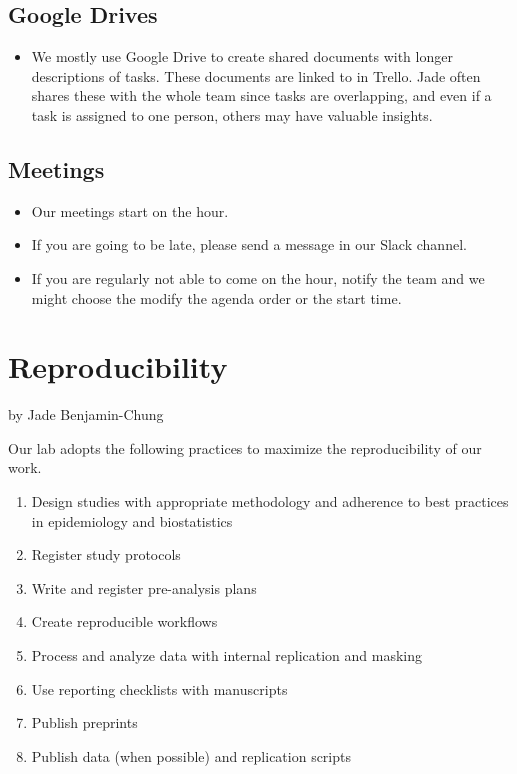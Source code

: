 \documentclass[
]{book}
\providecommand{\tightlist}{%
  \setlength{\itemsep}{0pt}\setlength{\parskip}{0pt}}
\begin{document}
\hypertarget{google-drives}{%
\section{Google Drives}\label{google-drives}}

\begin{itemize}
\tightlist
\item
  We mostly use Google Drive to create shared documents with longer descriptions of tasks. These documents are linked to in Trello. Jade often shares these with the whole team since tasks are overlapping, and even if a task is assigned to one person, others may have valuable insights.
\end{itemize}

\hypertarget{meetings}{%
\section{Meetings}\label{meetings}}

\begin{itemize}
\tightlist
\item
  Our meetings start on the hour.
\item
  If you are going to be late, please send a message in our Slack channel.
\item
  If you are regularly not able to come on the hour, notify the team and we might choose the modify the agenda order or the start time.
\end{itemize}

\hypertarget{reproducibility}{%
\chapter{Reproducibility}\label{reproducibility}}

by Jade Benjamin-Chung

Our lab adopts the following practices to maximize the reproducibility of our work.

\begin{enumerate}
\def\labelenumi{\arabic{enumi}.}
\tightlist
\item
  Design studies with appropriate methodology and adherence to best practices in epidemiology and biostatistics
\item
  Register study protocols
\item
  Write and register pre-analysis plans
\item
  Create reproducible workflows
\item
  Process and analyze data with internal replication and masking
\item
  Use reporting checklists with manuscripts
\item
  Publish preprints
\item
  Publish data (when possible) and replication scripts
\end{enumerate}
\end{document}
